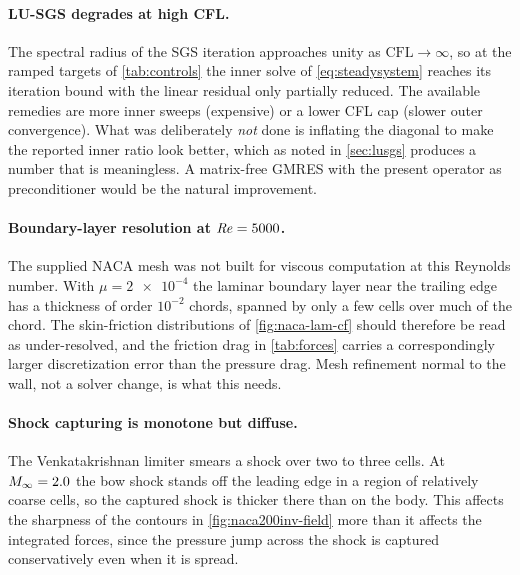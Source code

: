 \paragraph{LU-SGS degrades at high CFL.} The spectral radius of the SGS iteration
approaches unity as $\mathrm{CFL}\to\infty$, so at the ramped targets of
\cref{tab:controls} the inner solve of \cref{eq:steadysystem} reaches its
iteration bound with the linear residual only partially reduced. The available
remedies are more inner sweeps (expensive) or a lower CFL cap (slower outer
convergence). What was deliberately \emph{not} done is inflating the diagonal to
make the reported inner ratio look better, which as noted in \cref{sec:lusgs}
produces a number that is meaningless. A matrix-free GMRES with the present
operator as preconditioner would be the natural improvement.

\paragraph{Boundary-layer resolution at $\mathit{Re}=5000$.} The supplied NACA mesh was
not built for viscous computation at this Reynolds number. With
$\mu=\num{2e-4}$ the laminar boundary layer near the trailing edge has a thickness
of order $10^{-2}$ chords, spanned by only a few cells over much of the chord. The
skin-friction distributions of \cref{fig:naca-lam-cf} should therefore be read as
under-resolved, and the friction drag in \cref{tab:forces} carries a
correspondingly larger discretization error than the pressure drag. Mesh
refinement normal to the wall, not a solver change, is what this needs.

\paragraph{Shock capturing is monotone but diffuse.} The Venkatakrishnan limiter
smears a shock over two to three cells. At $M_\infty=2.0$ the bow shock stands off
the leading edge in a region of relatively coarse cells, so the captured shock is
thicker there than on the body. This affects the sharpness of the contours in
\cref{fig:naca200inv-field} more than it affects the integrated forces, since the
pressure jump across the shock is captured conservatively even when it is spread.

